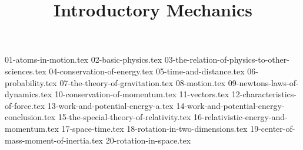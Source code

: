 

\usepackage{import}

\newcommand\bookmode{}


  \title{Introductory Mechanics}
  \maketitle

  {01-atoms-in-motion.tex}
  \clearpage
  {02-basic-physics.tex}
  \clearpage
  {03-the-relation-of-physics-to-other-sciences.tex}
  \clearpage
  {04-conservation-of-energy.tex}
  \clearpage
  {05-time-and-distance.tex}
  \clearpage
  {06-probability.tex}
  \clearpage
  {07-the-theory-of-gravitation.tex}
  \clearpage
  {08-motion.tex}
  \clearpage
  {09-newtons-laws-of-dynamics.tex}
  \clearpage
  {10-conservation-of-momentum.tex}
  \clearpage
  {11-vectors.tex}
  \clearpage
  {12-characteristics-of-force.tex}
  \clearpage
  {13-work-and-potential-energy-a.tex}
  \clearpage
  {14-work-and-potential-energy-conclusion.tex}
  \clearpage
  {15-the-special-theory-of-relativity.tex}
  \clearpage
  {16-relativistic-energy-and-momentum.tex}
  \clearpage
  {17-space-time.tex}
  \clearpage
  {18-rotation-in-two-dimensions.tex}
  \clearpage
  {19-center-of-mass-moment-of-inertia.tex}
  \clearpage
  {20-rotation-in-space.tex}

